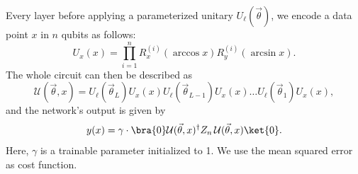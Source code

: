 \documentclass[a4paper,10pt]{article}
\begin{document}
\noindent
Every layer before applying a parameterized unitary $U_\ell(\vec{\theta})$, we encode a data point $x$ in $n$ qubits as follows:
\begin{equation} \label{eq:regression_encode}
U_x(x) = \prod_{i=1}^{n}R_x^{(i)}(\arccos x)R_y^{(i)}(\arcsin x).
\end{equation}
The whole circuit can then be described as
\begin{equation}
\mathcal{U}(\vec{\theta}, x) = U_\ell(\vec{\theta}_L)U_x(x) U_\ell(\vec{\theta}_{L-1})U_x(x) \ldots U_\ell(\vec{\theta}_1)U_x(x),
\end{equation}
and the network's output is given by
\begin{equation}
y(x) = \gamma \cdot \bra{0}\mathcal{U}(\vec{\theta}, x)^\dagger Z_n\, \mathcal{U}(\vec{\theta}, x)\ket{0}.
\end{equation}
Here, $\gamma$ is a trainable parameter initialized to 1.
We use the mean squared error as cost function.
\end{document}
